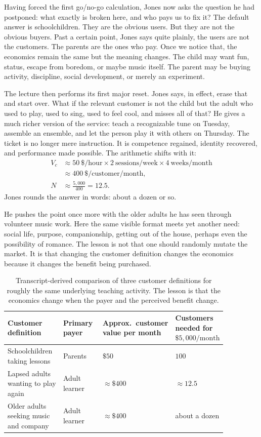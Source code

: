 Having forced the first go/no-go calculation, Jones now asks the question he had postponed: what exactly is broken here, and who pays us to fix it? The default answer is schoolchildren. They are the obvious users. But they are not the obvious buyers. Past a certain point, Jones says quite plainly, the users are not the customers. The parents are the ones who pay. Once we notice that, the economics remain the same but the meaning changes. The child may want fun, status, escape from boredom, or maybe music itself. The parent may be buying activity, discipline, social development, or merely an experiment.

The lecture then performs its first major reset. Jones says, in effect, erase that and start over. What if the relevant customer is not the child but the adult who used to play, used to sing, used to feel cool, and misses all of that? He gives a much richer version of the service: teach a recognizable tune on Tuesday, assemble an ensemble, and let the person play it with others on Thursday. The ticket is no longer mere instruction. It is competence regained, identity recovered, and performance made possible. The arithmetic shifts with it:
\begin{align}
V_c &\approx 50\ \$/\text{hour}\times 2\ \text{sessions/week}\times 4\ \text{weeks/month}\\
&\approx 400\ \$/\text{customer/month},\\
N &\approx \frac{5{,}000}{400}=12.5.
\end{align}
Jones rounds the answer in words: about a dozen or so.

He pushes the point once more with the older adults he has seen through volunteer music work. Here the same visible format meets yet another need: social life, purpose, companionship, getting out of the house, perhaps even the possibility of romance. The lesson is not that one should randomly mutate the market. It is that changing the customer definition changes the economics because it changes the benefit being purchased.

\begin{table}
\centering
\begin{tabular}{|p{0.28\linewidth}|p{0.20\linewidth}|p{0.22\linewidth}|p{0.16\linewidth}|}
\hline
Customer definition & Primary payer & Approx.\ customer value per month & Customers needed for \(\$5{,}000/\text{month}\) \\
\hline
Schoolchildren taking lessons & Parents & \(\$50\) & \(100\) \\
\hline
Lapsed adults wanting to play again & Adult learner & \(\approx \$400\) & \(\approx 12.5\) \\
\hline
Older adults seeking music and company & Adult learner & \(\approx \$400\) & about a dozen \\
\hline
\end{tabular}
\caption{Transcript-derived comparison of three customer definitions for roughly the same underlying teaching activity. The lesson is that the economics change when the payer and the perceived benefit change.}
\end{table}

